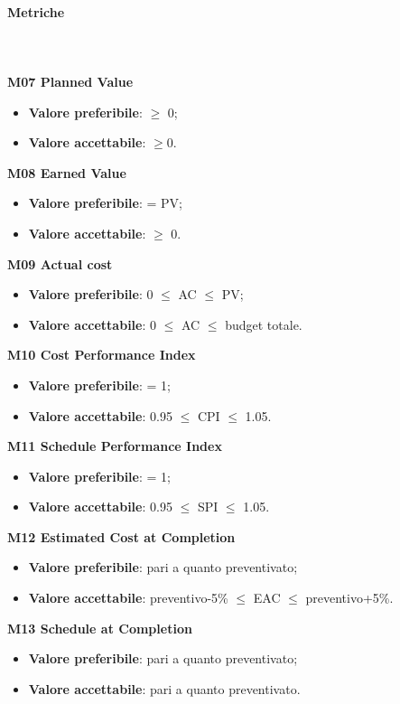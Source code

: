 			\paragraph{Metriche} \mbox{} \\ \\
			\textbf{M07 Planned Value}
			\begin{itemize}
				\item \textbf{Valore preferibile}: $\ge$ 0;
				\item \textbf{Valore accettabile}: $\ge$0.
			\end{itemize}
			\textbf{M08 Earned Value}
			\begin{itemize}
				\item \textbf{Valore preferibile}: = PV;
				\item \textbf{Valore accettabile}: $\ge$ 0.
			\end{itemize}
			\textbf{M09 Actual cost}
			\begin{itemize}
				\item \textbf{Valore preferibile}: 0 $\le$ AC $\le$ PV;
				\item \textbf{Valore accettabile}: 0 $\le$ AC $\le$ budget totale.
			\end{itemize}
			\textbf{M10 Cost Performance Index}
			\begin{itemize}
				\item \textbf{Valore preferibile}: = 1;
				\item \textbf{Valore accettabile}: 0.95 $\le$ CPI $\le$ 1.05.
			\end{itemize}
			\textbf{M11 Schedule Performance Index}
			\begin{itemize}
				\item \textbf{Valore preferibile}: = 1;
				\item \textbf{Valore accettabile}: 0.95 $\le$ SPI $\le$ 1.05.
			\end{itemize}
			\textbf{M12 Estimated Cost at Completion}
			\begin{itemize}
				\item \textbf{Valore preferibile}: pari a quanto preventivato;
				\item \textbf{Valore accettabile}: preventivo-5\% $\le$ EAC $\le$ preventivo+5\%.
			\end{itemize}
			\textbf{M13 Schedule at Completion}
			\begin{itemize}
				\item \textbf{Valore preferibile}: pari a quanto preventivato;
				\item \textbf{Valore accettabile}: pari a quanto preventivato.
			\end{itemize}
		
